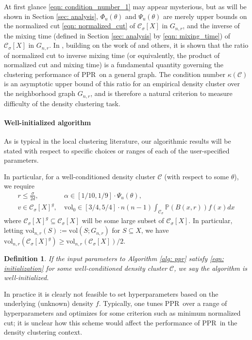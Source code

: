 \documentclass{article}
\newcommand{\vol}{\mathrm{vol}}
\newcommand{\1}{\mathbf{1}}
\newcommand{\Phibf}{\Phi_{u}}
\newcommand{\Psibf}{\Psi_{u}}
\newcommand{\Xbf}{X}             %
\newcommand{\Pbb}{\mathbb{P}}
\newcommand{\Cset}{\mathcal{C}}
\newcommand{\Csig}{\Cset_{\sigma}}
\newcommand{\pprspace}{{\sc PPR~}}
\theoremstyle{aldenthm}
\newtheorem{definition}{Definition}
\theoremstyle{aldenrmrk}
\begin{document}
At first glance \eqref{eqn: condition_number_1} may appear mysterious, but as will be shown in Section \ref{sec: analysis}, $\Phibf(\theta)$ and $\Psibf(\theta)$ are merely upper bounds on the normalized cut \eqref{eqn: normalized_cut} of $\Csig[\Xbf]$ in $G_{n,r}$, and the inverse of the mixing time (defined in Section \ref{sec: analysis} by \eqref{eqn: mixing_time}) of $\Csig[\Xbf]$ in $G_{n,r}$. In \cite{zhu2013}, building on the work of \cite{andersen2006} and others, it is shown that the ratio of normalized cut to inverse mixing time (or equivalently, the product of normalized cut and mixing time) is a fundamental quantity governing the clustering performance of \pprspace on a general graph. The condition number $\kappa(\Cset)$ is an asymptotic upper bound of this ratio for an empirical density cluster over the neighborhood graph $G_{n,r}$, and is therefore a natural criterion to measure difficulty of the density clustering task.

\paragraph{Well-initialized algorithm}

As is typical in the local clustering literature, our algorithmic results will be stated with respect to specific choices or ranges of each of the user-specified parameters.

In particular, for a well-conditioned density cluster $\Cset$ (with respect to some $\theta$), we require
\begin{align}
\label{eqn: initialization}
r \leq \frac{\sigma}{2d}, & ~\alpha \in [1/10, 1/9] \cdot \Psibf(\theta) \nonumber,  \\
v \in \Csig[\Xbf]^g, & ~\vol_0 \in [3/4,5/4] \cdot n(n-1) \int_{\Csig} \Pbb(B(x,r)) f(x) dx
\end{align}
where $\Csig[\Xbf]^g \subseteq \Csig[\Xbf]$ will be some large subset of $\Csig[\Xbf]$. In particular, letting $\vol_{n,r}(S) := \vol(S; G_{n,r})$ for $S \subseteq \Xbf$, we have $\vol_{n,r}(\Csig[\Xbf]^g) \geq \vol_{n,r}(\Csig[\Xbf])/2$.

\begin{definition}
	If the input parameters to Algorithm \ref{alg: ppr} satisfy \eqref{eqn: initialization} for some well-conditioned density cluster $\Cset$, we say the algorithm is \emph{well-initialized}.
\end{definition}

In practice it is clearly not feasible to set hyperparameters based on the underlying (unknown) density $f$. Typically, one tunes \pprspace over a range of hyperparameters and optimizes for some criterion such as minimum normalized cut; it is unclear how this scheme would affect the performance of \pprspace in the density clustering context.
\end{document}
